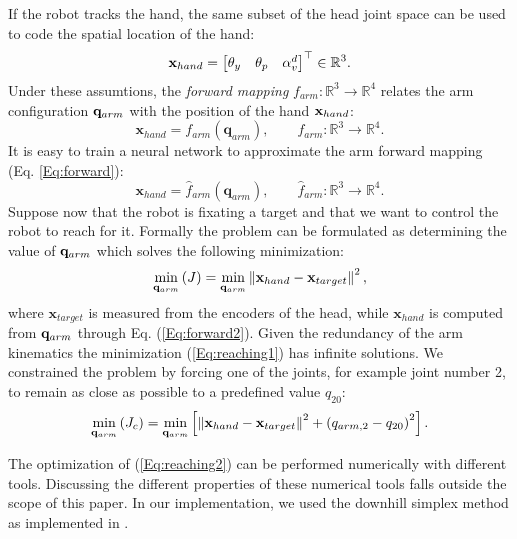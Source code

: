 If the robot tracks the hand, the same subset of the head joint space 
can be used to code the spatial location of the hand:
%
\begin{eqnarray*}
\mathbf{x}_{hand}=
\begin{bmatrix} \theta_y & \theta_p & \alpha_v^d\end{bmatrix}^\top \in \mathbb R^3.
\end{eqnarray*}
%
Under these assumtions, the \emph{forward mapping} 
$f_{arm} : \mathbb R^3 \longrightarrow \mathbb R^4$
relates the arm configuration $\mathbf q_{arm}$ with the position of the hand 
$\mathbf{x}_{hand}$:
%
\begin{equation} 
\label{Eq:forward}
\mathbf x_{hand}=f_{arm}(\mathbf q_{arm}), \qquad f_{arm} : \mathbb R^3 \longrightarrow \mathbb R^4.\end{equation}
%
It is easy to train a neural network to  approximate the arm forward mapping 
(Eq. \ref{Eq:forward}): 
%
\begin{equation} 
\label{Eq:forward2}
\mathbf x_{hand}=\hat{f}_{arm}(\mathbf q_{arm}), \qquad \hat{f}_{arm} : \mathbb R^3 \longrightarrow \mathbb R^4.\end{equation}
%
Suppose now that the robot is fixating a target and that we want to control 
the robot to reach for it. Formally the problem can be formulated 
as determining the value of $\mathbf q_{arm}$ which solves the 
following minimization:
%
\begin{equation} 
\label{Eq:reaching1}
  \displaystyle\min_{\mathbf q_{arm}} \left(J\right)=\displaystyle\min_{\mathbf q_{arm}}
  \left\|\mathbf x_{hand} - \mathbf x_{target}\right\|^2,
\end{equation}
%
where $\mathbf x_{target}$ is measured from the encoders of the head, while 
$\mathbf x_{hand}$ is computed from $\mathbf q_{arm}$ through Eq. (\ref{Eq:forward2}).
Given the redundancy of the arm kinematics the minimization 
(\ref{Eq:reaching1}) has infinite solutions. We constrained the problem by 
forcing one of the joints, for example joint number 2, to remain as close 
as possible to a predefined value $q_{20}$:
%
\begin{equation} 
\label{Eq:reaching2}
  \displaystyle\min_{\mathbf q_{arm}}\left(J_c\right)=\displaystyle\min_{\mathbf q_{arm}}
  \left[
  \left\|\mathbf x_{hand} - \mathbf x_{target}\right\|^2 + \left(q_{arm,2}-q_{20}\right)^2
  \right].
\end{equation}

The optimization of (\ref{Eq:reaching2}) can be performed numerically with 
different tools. Discussing the different properties of these numerical 
tools falls outside the scope of this paper. In our implementation, we used 
the downhill simplex method \cite{ne:Computer:65} as implemented in 
\cite{mo:Press:90}.

